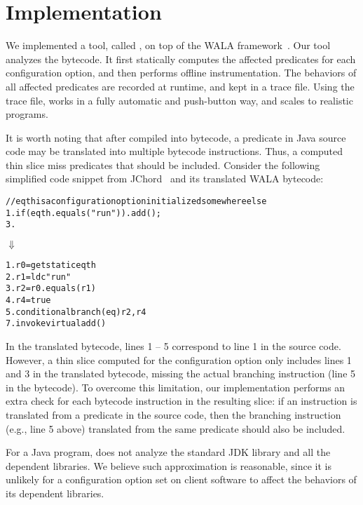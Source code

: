 \section{Implementation}
\label{sec:implementation}

We implemented a tool, called \ourtool, on top of the WALA
framework~\cite{wala}. Our tool analyzes the bytecode.
It first statically computes the affected predicates
for each configuration option, and then performs offline instrumentation.
The behaviors of all affected predicates are recorded at runtime, and
kept in a trace file. Using the trace file,
\ourtool works in a fully automatic and
push-button way, and scales to realistic programs.

It is worth noting that after compiled into bytecode,
a predicate in Java source code may be translated into multiple bytecode
instructions. Thus, a computed thin slice
miss predicates that should be included.
Consider the following simplified code snippet from JChord~\cite{jchord}
and its translated WALA bytecode:


\begin{CodeOut}
\begin{alltt}
   // eqth is a configuration option initialized somewhere else
1. if (eqth.equals("run")) .   add();
3. \ttrcb
\end{alltt}
\end{CodeOut}
\vspace{-2mm}
\hspace{20mm}$\Downarrow$ 
\begin{CodeOut}
\begin{alltt}
1. r0 = getstatic eqth
2. r1 = ldc "run"
3. r2 = r0.equals(r1)
4. r4 = true
5. conditional branch(eq) r2, r4
7. invokevirtual add() 
\end{alltt}
\end{CodeOut}

In the translated bytecode, lines 1 -- 5 correspond to line 1 in the
source code. However, a thin slice computed
for the configuration option  only includes lines 1 and 3
in the translated bytecode, missing the actual branching
instruction (line 5 in the bytecode).
To overcome this limitation, our implementation performs an extra check
for each bytecode instruction in the resulting slice:
if an instruction 
is translated from a predicate in the source code, then the
branching instruction (e.g., line 5 above) translated
from the same predicate should also be included.


For a Java program, \ourtool does not analyze the standard JDK
library and all the dependent libraries. We believe such approximation
is reasonable, since it is
unlikely for a configuration option set on client software
to affect the behaviors of its dependent libraries.

